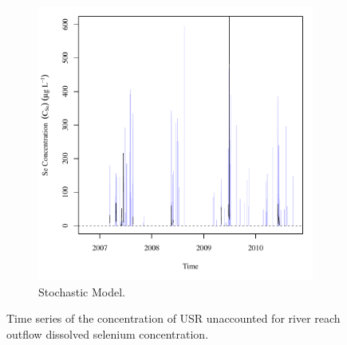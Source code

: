 \begin{linenumbers}
\begin{figure}[htbp]
\begin{subfigure}{0.5\textwidth}
		\includegraphics[width=0.9\linewidth]{"Figures/Results_USR/Balance Cout"}
		\caption{Stochastic Model.}
	\end{subfigure}
	\caption[Time series of the concentration of USR unaccounted for river reach outflow dissolved selenium concentration.]{Time series of the concentration of USR unaccounted for river reach outflow dissolved selenium concentration.}
	\label{fig:USRCout}
\end{figure}


\end{linenumbers}
